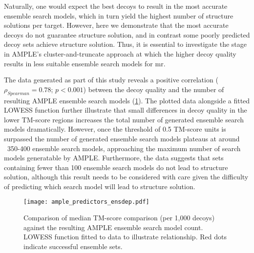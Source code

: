 Naturally, one would expect the best decoys to result in the most accurate ensemble search models, which in turn yield the highest number of structure solutions per target. However, here we demonstrate that the most accurate decoys do not guarantee structure solution, and in contrast some poorly predicted decoy sets achieve structure solution. Thus, it is essential to investigate the stage in AMPLE’s cluster-and-truncate approach at which the higher decoy quality results in less suitable ensemble search models for \gls{mr}.

The data generated as part of this study reveals a positive correlation ($\rho_{Spearman}=0.78$; $p<0.001$) between the decoy quality and the number of resulting AMPLE ensemble search models (\cref{fig:ample_predictor_ensdep}). The plotted data alongside a fitted LOWESS function further illustrate that small differences in decoy quality in the lower TM-score regions increases the total number of generated ensemble search models dramatically. However, once the threshold of 0.5 TM-score units \cite{Xu2010-sw} is surpassed the number of generated ensemble search models plateaus at around ~350-400 ensemble search models, approaching the maximum number of search models generatable by AMPLE. Furthermore, the data suggests that sets containing fewer than 100 ensemble search models do not lead to structure solution, although this result needs to be considered with care given the difficulty of predicting which search model will lead to structure solution.

\begin{figure}[H]
    \centering
    \texttt{[image: ample\_predictors\_ensdep.pdf]}
    \caption{Comparison of median TM-score comparison (per 1,000 decoys) against the resulting AMPLE ensemble search model count. LOWESS function fitted to data to illustrate relationship. Red dots indicate successful ensemble sets.}
    \label{fig:ample_predictor_ensdep}
\end{figure}


